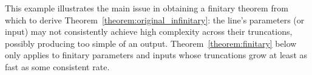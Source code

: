 This example illustrates the main issue in obtaining a finitary theorem from which to derive Theorem~\ref{theorem:original_infinitary}: the line's parameters (or input) may not consistently achieve high complexity across their truncations, possibly producing too simple of an output. Theorem~\ref{theorem:finitary} below only applies to finitary parameters and inputs whose truncations grow at least as fast as some consistent rate. 




